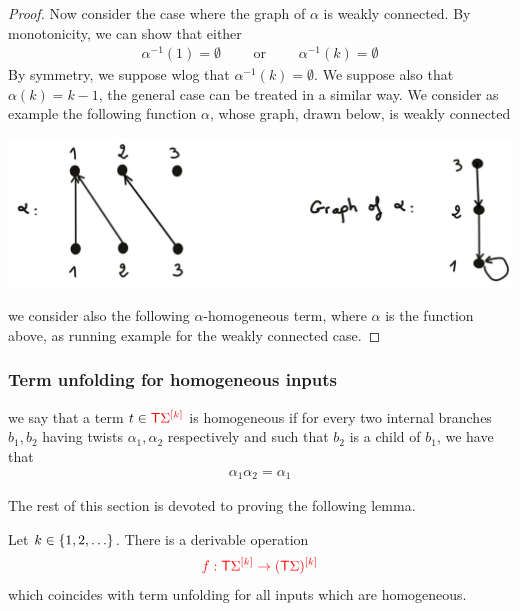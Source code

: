 \begin{proof}
Now consider the case where the graph of $\alpha$ is weakly connected. By monotonicity, we can show that either
\begin{align*}
\alpha^{-1}(1)=\emptyset\qquad\text{ or }\qquad\alpha^{-1}(k)=\emptyset
\end{align*}
By symmetry, we suppose wlog that $\alpha^{-1}(k)=\emptyset$. We suppose also that $\alpha(k)=k-1$, the general case can be treated in a similar way.
We consider as example the following function $\alpha$, whose graph, drawn below, is weakly connected
\begin{center}
\includegraphics[scale=.1]{MyPic32.jpg}
\end{center}
we consider also the following $\alpha$-homogeneous term, where $\alpha$ is the function above, as running example for the weakly connected case. 

\end{proof}


\subsubsection{Term unfolding for homogeneous inputs}
\label{subsec:something-homo-unfold}
we say that a term $ t \in \tmonad \mati k \rSigma$ is homogeneous if for every two internal branches $b_1, b_2$ having twists $\alpha_1, \alpha_2$ respectively and such that $b_2$ is a child of $b_1$, we have that
\begin{align*}
\alpha_1\alpha_2=\alpha_1
\end{align*}

The rest of this section is devoted to proving the following lemma. 

\begin{lemma}\label{lem:homo-2-twist}
    Let $k \in \set{1,2,\ldots}$. There is a derivable operation 
    \begin{align*}
        \ranked{f : \tmonad \mati k \rSigma \to \mati k {(\tmonad \Sigma)} }
        \end{align*}      
which coincides with term unfolding for all inputs which are homogeneous.
\end{lemma}

